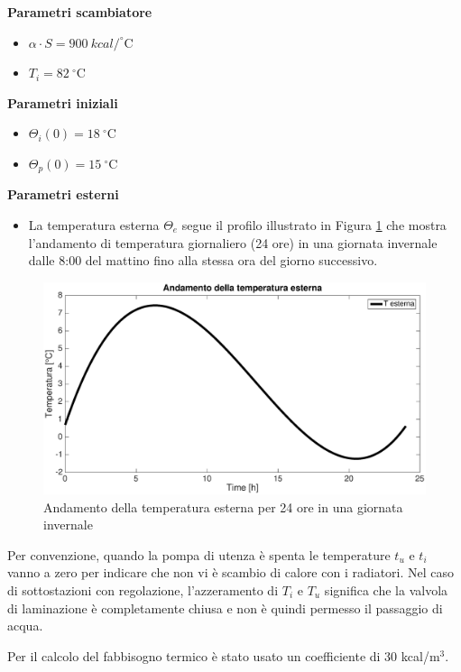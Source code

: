 \documentclass[laurea,oneside,11pt]{USiena_tesiLM3}
\begin{document}
\textbf{Parametri scambiatore}
\begin{itemize}
\item[]$\alpha \cdot S = 900 \ kcal / ^{\circ}$C
\item[]$T_i = 82 \ ^{\circ}$C
\end{itemize}

\textbf{Parametri iniziali}
\begin{itemize}
\item[]$\Theta_i(0) = 18 \ ^{\circ}$C
\item[]$\Theta_p(0) = 15 \ ^{\circ}$C
\end{itemize}

\textbf{Parametri esterni}
\begin{itemize}
\item[] La temperatura esterna $\Theta_e$ segue il profilo illustrato in Figura \ref{fig:temp_est} che mostra l'andamento di temperatura giornaliero (24 ore) in una giornata invernale dalle 8:00 del mattino fino alla stessa ora del giorno successivo. 
\end{itemize}


\begin{figure}[!h]
\centering
\includegraphics[width=\textwidth]{figure/temp_est} 
\caption{Andamento della temperatura esterna per 24 ore in una giornata invernale}
\label{fig:temp_est}
\end{figure}

Per convenzione, quando la pompa di utenza è spenta le temperature $t_u$ e $t_i$ vanno a zero per indicare che non vi è scambio di calore con i radiatori. Nel caso di sottostazioni con regolazione, l'azzeramento di $T_i$ e $T_u$ significa che la valvola di laminazione è completamente chiusa e non è quindi permesso il passaggio di acqua. 

Per il calcolo del fabbisogno termico è stato usato un coefficiente di 30 kcal/m$^3$.
\end{document}
